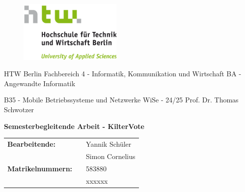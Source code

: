 \documentclass[11pt,a4paper,headsepline,footsepline,bibliography=totocnumbered]{article}
\begin{document}
\pagestyle{fancy}

\thispagestyle{empty}

\begin{center}
  \begin{figure}[h]
    \includegraphics[width=5cm]{pictures/htw-logo.png}
  \end{figure}

  \huge{HTW Berlin}
  \linebreak
  \Large{Fachbereich 4 - Informatik, Kommunikation und Wirtschaft}
  \linebreak
  \Large{BA - Angewandte Informatik}
  \linebreak

  \vspace{0.25cm}

  \Large{B35 - Mobile Betriebssysteme und Netzwerke}
  \linebreak
  \large{WiSe - 24/25}
  \linebreak
  \large{Prof. Dr. Thomas Schwotzer}
\end{center}

\vspace{1cm}


\begin{center}
  \textbf{\Huge{Semesterbegleitende Arbeit - KilterVote}}
\end{center}

\vspace{1cm}


\begin{flushleft}
\begin{tabular}{lll}
  \textbf{Bearbeitende:} & & Yannik Schüler \\ & & Simon Cornelius \\
  \textbf{Matrikelnummern:} & & 583880 \\ & &  xxxxxx \\
\end{tabular}


\end{flushleft}

\pagebreak %
\tableofcontents
\newpage
\end{document}
